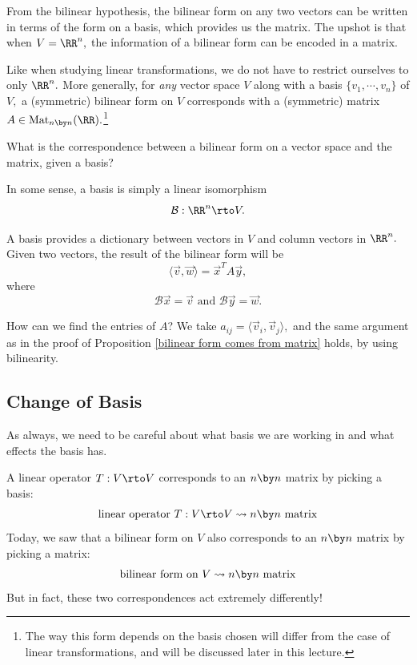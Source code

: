 From the bilinear hypothesis, the bilinear form on any two vectors can be written in terms of the form on a basis, which provides us the matrix. The upshot is that when $V = \RR^n,$ the information of a bilinear form can be encoded in a matrix.

Like when studying linear transformations, we do not have to restrict ourselves to only $\RR^n.$ More generally, for \emph{any} vector space $V$ along with a basis $\{v_1, \cdots, v_n\}$ of $V,$ a (symmetric) bilinear form on $V$ corresponds with a (symmetric) matrix $A \in \text{Mat}_{n \by n}(\RR).$\footnote{The way this form depends on the basis chosen will differ from the case of linear transformations, and will be discussed later in this lecture.}

\begin{qq}
What is the correspondence between a bilinear form on a vector space and the matrix, given a basis?
\end{qq}

In some sense, a basis is simply a linear isomorphism 
\[
\mathcal{B}: \RR^n \rto V.
\]

A basis provides a dictionary between vectors in $V$ and column vectors in $\RR^n.$ Given two vectors, the result of the bilinear form will be
\[
\langle \vec{v}, \vec{w} \rangle = \vec{x}^T A\vec{y},
\]
where \[
\mathcal{B}\vec{x} = \vec{v} \text{ and } \mathcal{B}\vec{y} = \vec{w}.
\] 

How can we find the entries of $A$? We take $a_{ij} = \langle \vec{v}_i, \vec{v}_j\rangle,$ and the same argument as in the proof of Proposition \ref{bilinear form comes from matrix} holds, by using bilinearity.
\subsection{Change of Basis}
As always, we need to be careful about what basis we are working in and what effects the basis has.

\begin{note}[Warning!]
A linear operator $T: V \rto V$ corresponds to an $n \by n$ matrix by picking a basis: \[\text{linear operator } T: V \rto V \leadsto n \by n \text{ matrix} \] Today, we saw that a bilinear form on $V$ also corresponds to an $n \by n$ matrix by picking a matrix:  \[\text{bilinear form on } V \leadsto n \by n \text{ matrix} \] But in fact, these two correspondences act extremely differently! 
\end{note}

